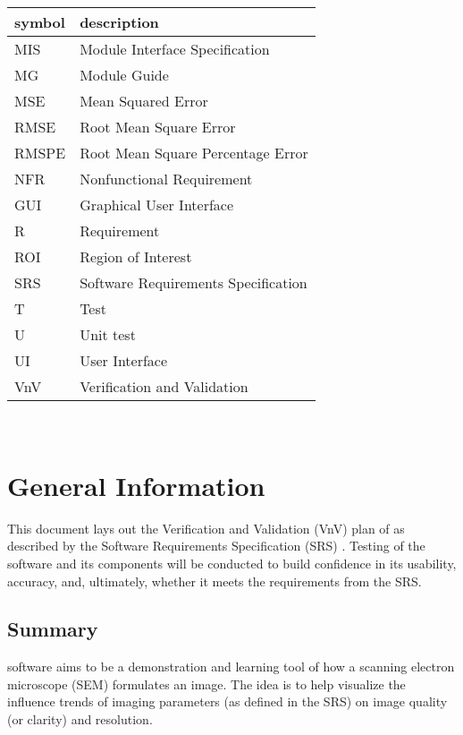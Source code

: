 \documentclass[12pt, titlepage]{article}
\begin{document}
\renewcommand{\arraystretch}{1.2}
\begin{tabular}{l l} 
  \toprule		
  \textbf{symbol} & \textbf{description}\\
  \midrule 
  MIS & Module Interface Specification \\
  MG & Module Guide \\
  MSE & Mean Squared Error\\
  RMSE & Root Mean Square Error\\
  RMSPE & Root Mean Square Percentage Error\\
  NFR & Nonfunctional Requirement\\
  GUI & Graphical User Interface\\
  R & Requirement\\
  ROI & Region of Interest\\
  SRS & Software Requirements Specification\\
  T & Test\\
  U & Unit test\\
  UI & User Interface\\
  VnV & Verification and Validation\\
  \bottomrule
\end{tabular}\\

\newpage


\section{General Information}

This document lays out the Verification and Validation (VnV) plan of \progname{}
as described by the Software Requirements Specification (SRS) 
\citep{SRS}. Testing of the software and its components will be conducted to build confidence in 
its usability, accuracy, and, ultimately, whether it meets the requirements from the SRS.

\subsection{Summary}

\progname{} software aims to be a demonstration and learning tool of how a scanning electron 
microscope (SEM) formulates an image. The idea is to help visualize the influence trends of imaging 
parameters (as defined in the SRS) on image quality (or clarity) and resolution.
\end{document}
